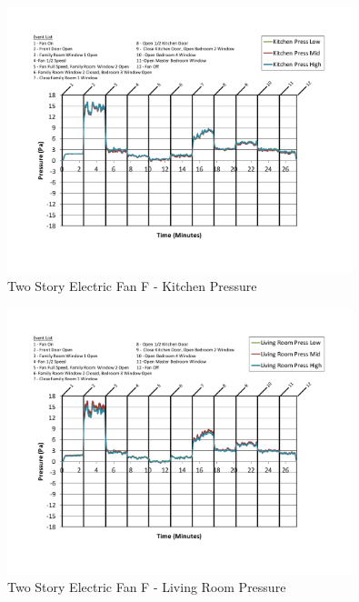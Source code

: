 \documentclass{article}
\begin{document}
\begin{appendices}
	\begin{figure}[H]
		\centering
		\includegraphics[height=3.05in,trim=0.67in 1.1in 0.67in 0.8in,clip=true]{0_Images/Results_Charts/ColdFlow/Two_Story/Electric/F/Kitchen_Pressure.pdf}
		\caption{Two Story Electric Fan F - Kitchen Pressure}
	\end{figure}
 

	\begin{figure}[H]
		\centering
		\includegraphics[height=3.05in,trim=0.67in 1.1in 0.67in 0.8in,clip=true]{0_Images/Results_Charts/ColdFlow/Two_Story/Electric/F/Living_Room_Pressure.pdf}
		\caption{Two Story Electric Fan F - Living Room Pressure}
	\end{figure}
 
	\clearpage


\end{appendices}
\end{document}
